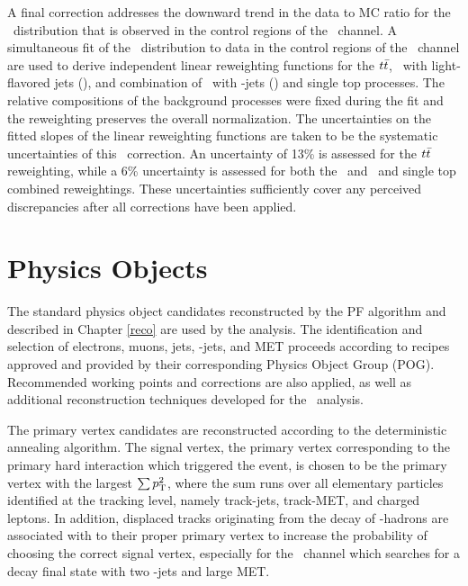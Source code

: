 A final correction addresses the downward trend in the data to MC ratio for the \pTV\ distribution that is observed in the control regions of the \WlnH\ channel. A simultaneous fit of the \pTV\ distribution to data in the control regions of the \WlnH\ channel are used to derive independent linear reweighting functions for the $t\bar{t}$, \bosW\ with light-flavored jets (\Wlight), and combination of \bosW\ with \qrkb-jets (\Wbb) and single top processes. The relative compositions of the background processes were fixed during the fit and the reweighting preserves the overall normalization. The uncertainties on the fitted slopes of the linear reweighting functions are taken to be the systematic uncertainties of this \pTV\ correction. An uncertainty of 13\% is assessed for the $t\bar{t}$ reweighting, while a 6\% uncertainty is assessed for both the \Wlight\ and \Wbb\ and single top combined reweightings. These uncertainties sufficiently cover any perceived discrepancies after all corrections have been applied.

\section{Physics Objects}

The standard physics object candidates reconstructed by the PF algorithm and described in Chapter \ref{reco} are used by the analysis. The identification and selection of electrons, muons, jets, \qrkb-jets, and MET proceeds according to recipes approved and provided by their corresponding Physics Object Group (POG). Recommended working points and corrections are also applied, as well as additional reconstruction techniques developed for the \VHbb\ analysis.

The primary vertex candidates are reconstructed according to the deterministic annealing algorithm.\cite{ITERTRACK} The signal vertex, the primary vertex corresponding to the primary hard interaction which triggered the event, is chosen to be the primary vertex with the largest $\sum p_{\mathrm{T}}^{2}$, where the sum runs over all elementary particles identified at the tracking level, namely track-jets, track-MET, and charged leptons. In addition, displaced tracks originating from the decay of \qrkb-hadrons are associated with to their proper primary vertex to increase the probability of choosing the correct signal vertex, especially for the \ZnnH\ channel which searches for a decay final state with two \qrkb-jets and large MET.

